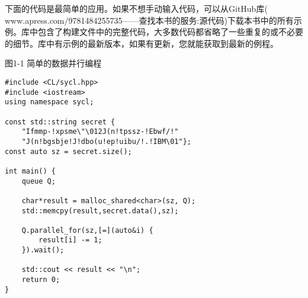下面的代码是最简单的应用。如果不想手动输入代码，可以从GitHub库(\\www.apress.com/9781484255735——查找本书的服务:源代码)下载本书中的所有示例。库中包含了构建文件中的完整代码，大多数代码都省略了一些重复的或不必要的细节。库中有示例的最新版本，如果有更新，您就能获取到最新的例程。\par

图1-1 简单的数据并行编程
\begin{lstlisting}[caption={}]
#include <CL/sycl.hpp>
#include <iostream>
using namespace sycl;

const std::string secret {
	"Ifmmp-!xpsme\"\012J(n!tpssz-!Ebwf/!"
	"J(n!bgsbje!J!dbo(u!ep!uibu/!.!IBM\01"};
const auto sz = secret.size();

int main() {
	queue Q;
	
	char*result = malloc_shared<char>(sz, Q);
	std::memcpy(result,secret.data(),sz);
	
	Q.parallel_for(sz,[=](auto&i) {
		result[i] -= 1;
	}).wait();

	std::cout << result << "\n";
	return 0;
}
\end{lstlisting}